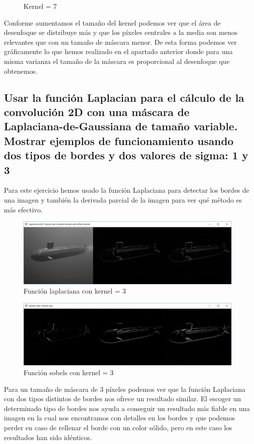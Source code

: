 \documentclass{article}
\begin{document}
\begin{figure}[h]
\begin{minipage}[b]{0.1\linewidth}
\caption{Kernel = 7}
\end{minipage}
\end{figure}


Conforme aumentamos el tamaño del kernel podemos ver que el área de desenfoque se distribuye más y que los píxeles centrales a la media son menos relevantes que con un tamaño de máscara menor. De esta forma podemos ver gráficamente lo que hemos realizado en el apartado anterior donde para una misma varianza el tamaño de la máscara es proporcional al desenfoque que obtenemos.	

\newpage
\subsection{Usar la función Laplacian para el cálculo de la convolución 2D con una máscara de Laplaciana-de-Gaussiana de tamaño variable. Mostrar ejemplos de funcionamiento usando dos tipos de bordes y dos valores de sigma: 1 y 3}

Para este ejercicio hemos usado la función Laplaciana para detectar los bordes de una imagen y también la derivada parcial de la imagen para ver qué método es más efectivo.


\begin{figure}[h]
\centering
\includegraphics[scale=0.5]{1c1.PNG}
\caption{Función laplaciana con kernel = 3}
\end{figure}


\begin{figure}[h]
\centering
\includegraphics[scale=0.5]{1c2.PNG}
\caption{Función sobels con kernel = 3}
\end{figure}

Para un tamaño de máscara de 3 píxeles podemos ver que la función Laplaciana con dos tipos distintos de bordes nos ofrece un resultado similar. El escoger un determinado tipo de bordes nos ayuda a conseguir un resultado más fiable en una imagen en la cual nos encontramos con detalles en los bordes y que podemos perder en caso de rellenar el borde con un color sólido, pero en este caso los resultados han sido idénticos.
\end{document}
